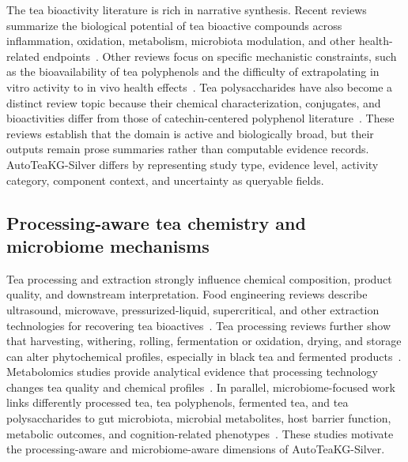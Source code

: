 \documentclass[11pt]{article}
\begin{document}
The tea bioactivity literature is rich in narrative synthesis. Recent reviews summarize the biological potential of tea bioactive compounds across inflammation, oxidation, metabolism, microbiota modulation, and other health-related endpoints~\cite{luo2024tea_bioactive_review}. Other reviews focus on specific mechanistic constraints, such as the bioavailability of tea polyphenols and the difficulty of extrapolating in vitro activity to in vivo health effects~\cite{yang2025bioavailability_tea_polyphenols}. Tea polysaccharides have also become a distinct review topic because their chemical characterization, conjugates, and bioactivities differ from those of catechin-centered polyphenol literature~\cite{rashwan2025tea_polysaccharides_review}. These reviews establish that the domain is active and biologically broad, but their outputs remain prose summaries rather than computable evidence records. AutoTeaKG-Silver differs by representing study type, evidence level, activity category, component context, and uncertainty as queryable fields.

\subsection{Processing-aware tea chemistry and microbiome mechanisms}

Tea processing and extraction strongly influence chemical composition, product quality, and downstream interpretation. Food engineering reviews describe ultrasound, microwave, pressurized-liquid, supercritical, and other extraction technologies for recovering tea bioactives~\cite{raghunath2023tea_extraction_review}. Tea processing reviews further show that harvesting, withering, rolling, fermentation or oxidation, drying, and storage can alter phytochemical profiles, especially in black tea and fermented products~\cite{aaqil2023black_tea_processing_review}. Metabolomics studies provide analytical evidence that processing technology changes tea quality and chemical profiles~\cite{wang2024processing_metabolomics}. In parallel, microbiome-focused work links differently processed tea, tea polyphenols, fermented tea, and tea polysaccharides to gut microbiota, microbial metabolites, host barrier function, metabolic outcomes, and cognition-related phenotypes~\cite{zhao2024processed_tea_microbiota,song2024oolong_neuroprotection,tian2024obesity_microbiota,zhang2024fermented_tea_microbiota,arce2025kombucha_rct}. These studies motivate the processing-aware and microbiome-aware dimensions of AutoTeaKG-Silver.
\end{document}
